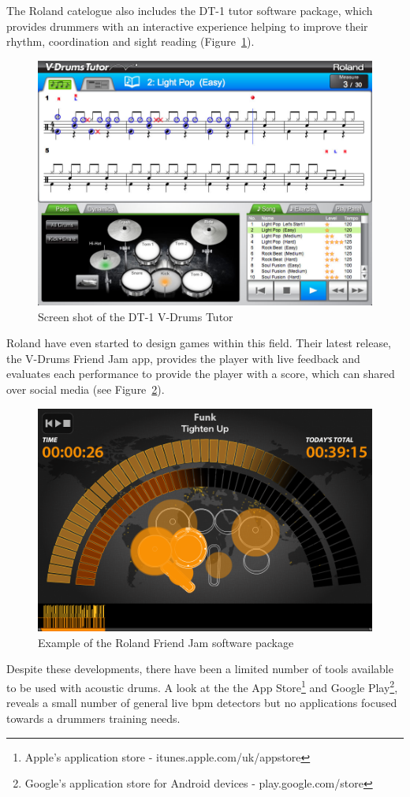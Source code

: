 \documentclass[a4paper, 11pt]{article}
\begin{document}
The Roland catelogue also includes the DT-1 tutor software package, which provides drummers with an interactive experience helping to improve their rhythm, coordination and sight reading \cite{roland} (Figure~\ref{fig: dt-1}).\par 
\begin{figure}[h]
\centering
  \includegraphics[width=0.5\linewidth]{images/dt-1_ss_main_notation_gal.jpg}
  \caption{Screen shot of the DT-1 V-Drums Tutor \cite{roland}}
  \label{fig: dt-1}
\end{figure}
Roland have even started to design games within this field. Their latest release, the V-Drums Friend Jam app, provides the player with live feedback and evaluates each performance to provide the player with a score, which can shared over social media (see Figure~\ref{fig: friendjam}). \par

\begin{figure}[h]
\centering
\includegraphics[scale=0.2]{images/friendjam.png}
\caption{Example of the Roland Friend Jam software package \cite{roland}}
\label{fig: friendjam}
\end{figure}

Despite these developments, there have been a limited number of tools available to be used with acoustic drums. A look at the the App Store\footnote{Apple's application store - itunes.apple.com/uk/appstore‎} and Google Play\footnote{Google's application store for Android devices - play.google.com/store}, reveals a small number of general live bpm detectors but no applications focused towards a drummers training needs.\par
\end{document}
